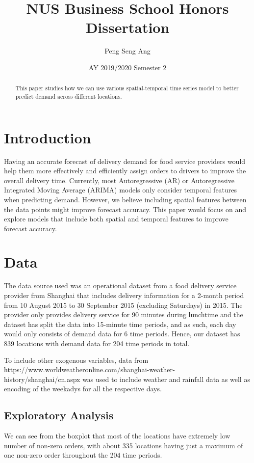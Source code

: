 \documentclass[10pt, letterpaper] {article}
\begin{document}
	\title{NUS Business School Honors Dissertation}
	\author{Peng Seng Ang}
	\date{AY 2019/2020 Semester 2}
	\maketitle
\begin{abstract}
This paper studies how we can use various spatial-temporal time series model to better predict demand across different locations. 
\end{abstract}
\section{Introduction}
Having an accurate forecast of delivery demand for food service providers would help them more effectively and efficiently assign orders to drivers to improve the overall delivery time. Currently, most Autoregressive (AR) or Autoregressive Integrated Moving Average (ARIMA) models only consider temporal features when predicting demand. However, we believe including spatial features between the data points might improve forecast accuracy. This paper would focus on and explore models that include both spatial and temporal features to improve forecast accuracy. 
\section{Data}
The data source used was an operational dataset from a food delivery service provider from Shanghai that includes delivery information for a 2-month period from 10 August 2015 to 30 September 2015 (excluding Saturdays) in 2015. The provider only provides delivery service for 90 minutes during lunchtime and the dataset has split the data into 15-minute time periods, and as such, each day would only consists of demand data for 6 time periods. Hence, our dataset has 839 locations with demand data for 204 time periods in total. 

To include other exogenous variables, data from https://www.worldweatheronline.com/shanghai-weather-history/shanghai/cn.aspx was used to include weather and rainfall data as well as encoding of the weekadys for all the respective days. 

\subsection{Exploratory Analysis}
We can see from the boxplot that most of the locations have extremely low number of non-zero orders, with about 335 locations having just a maximum of one non-zero order throughout the 204 time periods. 
\end{document}
